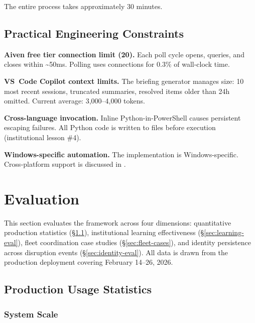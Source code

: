 \documentclass[11pt,a4paper]{article}
\begin{document}
The entire process takes approximately 30 minutes.


\subsection{Practical Engineering Constraints}
\label{sec:constraints}

\textbf{Aiven free tier connection limit (20).} Each poll cycle opens, queries, and closes within \textasciitilde50ms. Polling uses connections for 0.3\% of wall-clock time.

\textbf{VS~Code Copilot context limits.} The briefing generator manages size: 10 most recent sessions, truncated summaries, resolved items older than 24h omitted. Current average: 3,000--4,000 tokens.

\textbf{Cross-language invocation.} Inline Python-in-PowerShell causes persistent escaping failures. All Python code is written to files before execution (institutional lesson \#4).

\textbf{Windows-specific automation.} The implementation is Windows-specific. Cross-platform support is discussed in .



\section{Evaluation}
\label{sec:evaluation}

This section evaluates the framework across four dimensions: quantitative production statistics (\S\ref{sec:prod-stats}), institutional learning effectiveness (\S\ref{sec:learning-eval}), fleet coordination case studies (\S\ref{sec:fleet-cases}), and identity persistence across disruption events (\S\ref{sec:identity-eval}). All data is drawn from the production deployment covering February 14--26, 2026.


\subsection{Production Usage Statistics}
\label{sec:prod-stats}

\subsubsection{System Scale}
\end{document}
